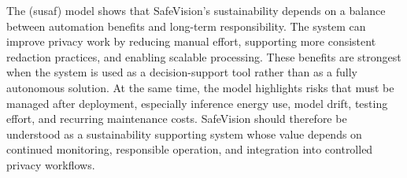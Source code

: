 The (\acrshort{susaf}) model shows that \gls{SafeVision}'s sustainability depends on a balance between automation benefits and long-term responsibility. The system can improve privacy work by reducing manual effort, supporting more consistent redaction practices, and enabling scalable processing. These benefits are strongest when the system is used as a decision-support tool rather than as a fully autonomous solution. At the same time, the model highlights risks that must be managed after deployment, especially \gls{inference} energy use, model drift, testing effort, and recurring maintenance costs. \gls{SafeVision} should therefore be understood as a sustainability supporting system whose value depends on continued monitoring, responsible operation, and integration into controlled privacy workflows.